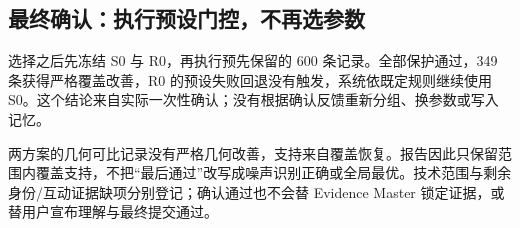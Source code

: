 \subsection{最终确认：执行预设门控，不再选参数}
选择之后先冻结 S0 与 R0，再执行预先保留的 600 条记录。全部保护通过，349 条获得严格覆盖改善，R0 的预设失败回退没有触发，系统依既定规则继续使用 S0。这个结论来自实际一次性确认；没有根据确认反馈重新分组、换参数或写入记忆。

两方案的几何可比记录没有严格几何改善，支持来自覆盖恢复。报告因此只保留范围内覆盖支持，不把“最后通过”改写成噪声识别正确或全局最优。技术范围与剩余身份/互动证据缺项分别登记；确认通过也不会替 Evidence Master 锁定证据，或替用户宣布理解与最终提交通过。
